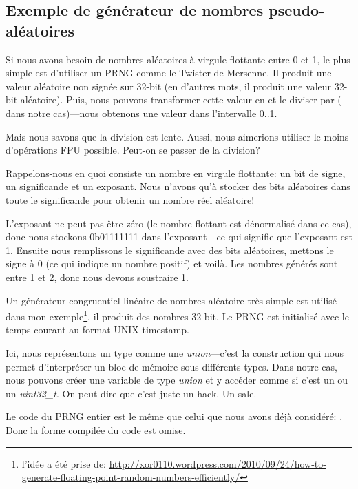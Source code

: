 \subsection{Exemple de générateur de nombres pseudo-aléatoires}
\label{FPU_PRNG}

Si nous avons besoin de nombres aléatoires à virgule flottante entre 0 et 1, le plus
simple est d'utiliser un \ac{PRNG} comme le Twister de Mersenne.
Il produit une valeur aléatoire non signée sur 32-bit (en d'autres mots, il produit
une valeur 32-bit aléatoire).
Puis, nous pouvons transformer cette valeur en \Tfloat et le diviser par 
( dans notre cas)---nous obtenons une valeur dans l'intervalle 0..1.

Mais nous savons que la division est lente.
Aussi, nous aimerions utiliser le moins d'opérations FPU possible.
Peut-on se passer de la division?


Rappelons-nous en quoi consiste un nombre en virgule flottante: un bit de signe,
un significande et un exposant.
Nous n'avons qu'à stocker des bits aléatoires dans toute le significande pour obtenir
un nombre réel aléatoire!

L'exposant ne peut pas être zéro (le nombre flottant est dénormalisé dans ce cas),
donc nous stockons 0b01111111 dans l'exposant---ce qui signifie que l'exposant est
1.
Ensuite nous remplissons le significande avec des bits aléatoires, mettons le signe à
0 (ce qui indique un nombre positif) et voilà.
Les nombres générés sont entre 1 et 2, donc nous devons soustraire 1.

\newcommand{\URLXOR}{\url{http://xor0110.wordpress.com/2010/09/24/how-to-generate-floating-point-random-numbers-efficiently/}}

Un générateur congruentiel linéaire de nombres aléatoire très simple est utilisé dans
mon exemple\footnote{l'idée a été prise de: \URLXOR}, il produit des nombres 32-bit.
Le \ac{PRNG} est initialisé avec le temps courant au format UNIX timestamp.

Ici, nous représentons un type \Tfloat comme une \emph{union}---c'est la construction \CCpp qui nous
permet d'interpréter un bloc de mémoire sous différents types.
Dans notre cas, nous pouvons créer une variable de type \emph{union} et y accéder comme
si c'est un \Tfloat ou un \emph{uint32\_t}.
On peut dire que c'est juste un hack. Un sale.


Le code du \ac{PRNG} entier est le même que celui que nous avons déjà considéré: .
Donc la forme compilée du code est omise.

